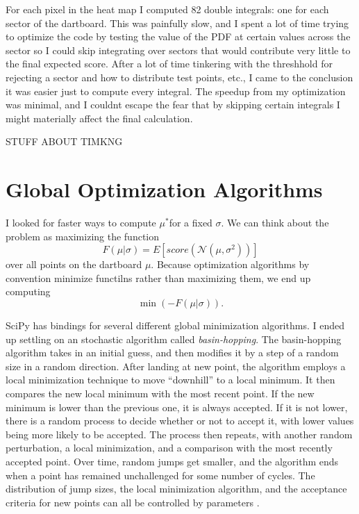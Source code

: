 \documentclass[]{article}
\newcommand{\mustar}{\ensuremath{\mu^* }}
\begin{document}
For each pixel in the heat map I computed 82 double integrals: one for each sector of the dartboard. This was painfully slow, and I spent a lot of time trying to optimize the code by testing the value of the PDF at certain values across the sector so I could skip integrating over sectors that would contribute very little to the final expected score. After a lot of time tinkering with the threshhold for rejecting a sector and how to distribute test points, etc., I came to the conclusion it was easier just to compute every integral. The speedup from my optimization was minimal, and I couldnt escape the fear that by skipping certain integrals I might materially affect the final calculation.

STUFF ABOUT TIMKNG

\section{Global Optimization Algorithms}

I looked for faster ways to compute  \mustar for a fixed $\sigma$. We can think about the problem as maximizing the function
\begin{equation}
	F(\mu \vert \sigma)  = E[score(\mathcal{N}(\mu, \sigma^2))]
\end{equation}
over all points  on the dartboard $\mu$. Because optimization algorithms by convention minimize functilns rather than maximizing them, we end up computing 
\begin{equation}
	\min(-F(\mu \vert \sigma)).
\end{equation}

SciPy has bindings for several different global minimization algorithms. I ended up settling on an stochastic algorithm called \textit{basin-hopping}. The basin-hopping algorithm takes in an initial guess, and then modifies it by a step of a random size in a random direction. After landing at new point, the algorithm employs a local minimization technique to move ``downhill'' to a local minimum. It then compares the new local minimum with the most recent point. If the new minimum is lower than the previous one, it is always accepted. If it is not lower, there is a random process to decide whether or not to accept it, with lower values being more likely to be accepted. The process then repeats, with another random perturbation, a local minimization, and a comparison with the most recently accepted point. Over time, random jumps get smaller, and the algorithm ends when a point has remained unchallenged for some number of cycles. The distribution of jump sizes, the local minimization algorithm, and the acceptance criteria for new points can all be controlled by parameters \cite{basin}. 
\end{document}
